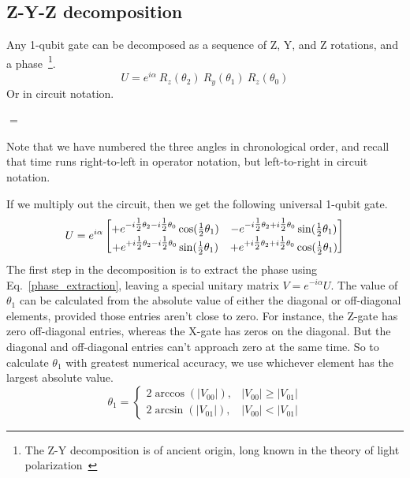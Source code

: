 \subsection{Z-Y-Z decomposition}
\label{sec:ZYZdeke}
Any 1-qubit gate can be decomposed as a sequence of Z, Y, and Z rotations, and a phase~\cite{Barenco1995b}\footnote{The Z-Y decomposition is of ancient origin, long known in the theory of light polarization~\cite{Sousa2006a}}.
\[
U =  e^{i\alpha}\ R_z(\theta_2)\ R_y(\theta_1)\ R_z(\theta_0)
\]
Or in circuit notation.
\begin{center}
$=$

\end{center}
Note that we have numbered the three angles in chronological order, and recall that time runs right-to-left in operator notation, but left-to-right in circuit notation. 

If we multiply out the circuit, then we get the following universal 1-qubit gate.
\[
U = 
e^{i\alpha} \begin{bmatrix}
+e^{-i\tfrac{1}{2}\theta_2  -i\tfrac{1}{2}\theta_0} \cos(\tfrac{1}{2}\theta_1)
& -e^{-i\tfrac{1}{2}\theta_2 + i\tfrac{1}{2}\theta_0} \sin(\tfrac{1}{2}\theta_1)
\\
+e^{+i\tfrac{1}{2}\theta_2 - i\tfrac{1}{2}\theta_0} \sin(\tfrac{1}{2}\theta_1)
& +e^{+i\tfrac{1}{2}\theta_2 +i\tfrac{1}{2}\theta_0} \cos(\tfrac{1}{2}\theta_1)
\end{bmatrix}
\]
The first step in the decomposition is to extract the phase using Eq.~\eqref{phase_extraction}, leaving a special unitary matrix $V = e^{-i\alpha} U$.
%
The value of $\theta_1$ can be calculated from the absolute value of either the diagonal or off-diagonal elements, provided those entries aren't close to zero.
For instance, the Z-gate has zero off-diagonal entries, whereas the X-gate has zeros on the diagonal. But the diagonal and off-diagonal entries can't approach zero at the same time.  So to calculate $\theta_1$ with greatest numerical accuracy, we use whichever element has the largest absolute value.
\[
\theta_1 = 
  \begin{cases}
		2 \arccos(|V_{00}|), & |V_{00}| \geq |V_{01}|\\	
		2 \arcsin(|V_{01}|), & |V_{00}| < |V_{01}|		
	\end{cases} 
\]

